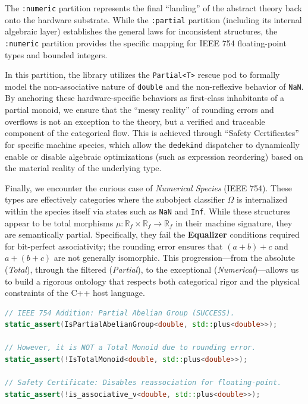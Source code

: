 \documentclass[11pt, a4paper]{report}
\begin{document}
The \texttt{:numeric} partition represents the final ``landing'' of the abstract theory back onto the hardware substrate. While the \texttt{:partial} partition (including its internal algebraic layer) establishes the general laws for inconsistent structures, the \texttt{:numeric} partition provides the specific mapping for IEEE 754 floating-point types and bounded integers. 

In this partition, the library utilizes the \texttt{Partial<T>} rescue pod to formally model the non-associative nature of \texttt{double} and the non-reflexive behavior of \texttt{NaN}. By anchoring these hardware-specific behaviors as first-class inhabitants of a partial monoid, we ensure that the ``messy reality'' of rounding errors and overflows is not an exception to the theory, but a verified and traceable component of the categorical flow. This is achieved through ``Safety Certificates'' for specific machine species, which allow the \texttt{dedekind} dispatcher to dynamically enable or disable algebraic optimizations (such as expression reordering) based on the material reality of the underlying type.

Finally, we encounter the curious case of \textit{Numerical Species} (IEEE 754). These types are effectively categories where the subobject classifier $\Omega$ is internalized within the species itself via states such as \texttt{NaN} and \texttt{Inf}. While these structures appear to be total morphisms $\mu: \mathbb{R}_{f} \times \mathbb{R}_{f} \to \mathbb{R}_{f}$ in their machine signature, they are semantically partial. Specifically, they fail the \textbf{Equalizer} conditions required for bit-perfect associativity; the rounding error ensures that $(a+b)+c$ and $a+(b+c)$ are not generally isomorphic. This progression—from the absolute (\textit{Total}), through the filtered (\textit{Partial}), to the exceptional (\textit{Numerical})—allows us to build a rigorous ontology that respects both categorical rigor and the physical constraints of the C++ host language.

\begin{lstlisting}[language=C++, caption={The Numeric Landing: Verifying the IEEE 754 Partial Monoid.}, label={lst:numeric_landing}]
// IEEE 754 Addition: Partial Abelian Group (SUCCESS).
static_assert(IsPartialAbelianGroup<double, std::plus<double>>);

// However, it is NOT a Total Monoid due to rounding error.
static_assert(!IsTotalMonoid<double, std::plus<double>>);

// Safety Certificate: Disables reassociation for floating-point.
static_assert(!is_associative_v<double, std::plus<double>>);
\end{lstlisting}
\end{document}
